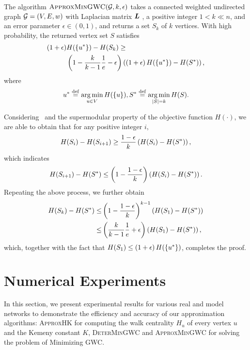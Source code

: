 \documentclass[10pt,twocolumn,twoside]{IEEEtran}
\begin{document}
\begin{theorem}\label{Mainthm}
    The algorithm \(\textsc{ApproxMinGWC}(\mathcal{G},k,\epsilon)\) takes a connected weighted undirected graph \(\mathcal{G}=(V,E,w)\) with Laplacian matrix \(\boldsymbol{L}\) , a positive integer \(1<k \ll n\), and an error parameter \(\epsilon\in(0,1)\), and returns a set  \(S_k\) of \(k\) vertices. With high probability, the returned vertex set \(S\) satisfies
    \begin{align*}
        \left( 1+\epsilon \right) & H(\left\{u^* \right\})-H(S_k)\ge                                                                    \\
                           & \left( 1-\frac{k}{k-1}\frac{1}{e}-\epsilon \right)\left( \left( 1+\epsilon \right)H(\left\{u^* \right\})-H(S^*) \right),
    \end{align*}
    where
    \[u^*\stackrel{\mathrm{def}}{=}\operatorname*{arg\,min}_{u\in V}H(\left\{u \right\}), S^*\stackrel{\mathrm{def}}{=}\operatorname*{arg\,min}_{\left|S \right|=k}H(S).\]
\end{theorem}
\begin{IEEEproof}
    Considering~ and the supermodular property of the objective function $H(\cdot)$, we are able to obtain  that for any positive integer \(i\),
    \begin{equation*}
        H(S_i)-H(S_{i+1})\ge\frac{1-\epsilon}{k}\left( H(S_i)-H(S^*) \right),
    \end{equation*}
    which indicates
    \begin{equation*}
        H(S_{i+1})-H(S^*)\le\left( 1-\frac{1-\epsilon}{k} \right)\left( H(S_i)-H(S^*) \right).
    \end{equation*}
    Repeating the above process, we  further obtain
    \begin{align*}
        H(S_k)-H(S^*) \le & \left( 1-\frac{1-\epsilon}{k} \right)^{k-1}\left( H(S_1)-H(S^*) \right)       \\
        \le                       & \left( \frac{k}{k-1}\frac{1}{e}+\epsilon \right)\left( H(S_1)-H(S^*) \right),
    \end{align*}
    which, together with  the fact that \(H(S_1)\le\left( 1+\epsilon \right)H(\left\{u^* \right\})\),
    completes the proof.
\end{IEEEproof}


\section{Numerical Experiments}

In this section, we present experimental results for various real and model networks to demonstrate the  efficiency and accuracy of our  approximation algorithms:  \textsc{ApproxHK} for computing the walk centrality \(H_u\) of  every vertex $u$ and the Kemeny constant \(K\), \textsc{DeterMinGWC} and \textsc{ApproxMinGWC} for solving the problem of Minimizing GWC.
\end{document}
